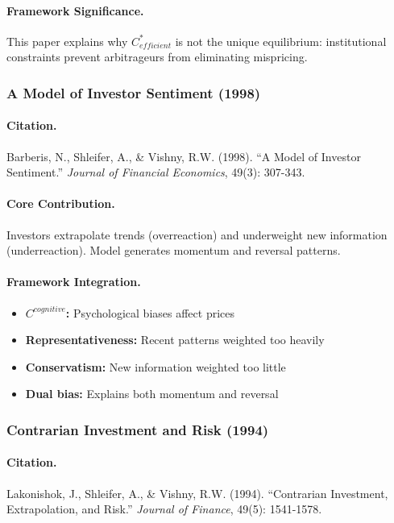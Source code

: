 \documentclass[12pt,a4paper]{article}
\begin{document}
\paragraph{Framework Significance.}
This paper explains why $C^*_{efficient}$ is not the unique equilibrium:
institutional constraints prevent arbitrageurs from eliminating mispricing.

\subsubsection{A Model of Investor Sentiment (1998)}

\paragraph{Citation.}
Barberis, N., Shleifer, A., \& Vishny, R.W. (1998).
``A Model of Investor Sentiment.''
\emph{Journal of Financial Economics}, 49(3): 307-343.

\paragraph{Core Contribution.}
Investors extrapolate trends (overreaction) and underweight new information
(underreaction). Model generates momentum and reversal patterns.

\paragraph{Framework Integration.}
\begin{itemize}
  \item \textbf{$C^{cognitive}$:} Psychological biases affect prices
  \item \textbf{Representativeness:} Recent patterns weighted too heavily
  \item \textbf{Conservatism:} New information weighted too little
  \item \textbf{Dual bias:} Explains both momentum and reversal
\end{itemize}

\subsubsection{Contrarian Investment and Risk (1994)}

\paragraph{Citation.}
Lakonishok, J., Shleifer, A., \& Vishny, R.W. (1994).
``Contrarian Investment, Extrapolation, and Risk.''
\emph{Journal of Finance}, 49(5): 1541-1578.
\end{document}
